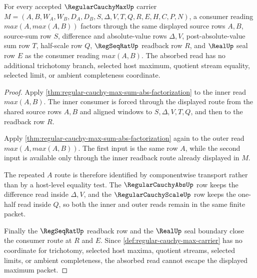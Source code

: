 \begin{theorem}
\label{thm:regular-cauchy-max-lattice-absorption}
For every accepted $\RegularCauchyMaxUp$ carrier $M=(A,B,W_A,W_B,D_A,D_B,S,\Delta,V,T,Q,R,E,H,C,P,N)$, a consumer reading $max(A,max(A,B))$ factors through the same displayed source rows $A,B$, source-sum row $S$, difference and absolute-value rows $\Delta,V$, post-absolute-value sum row $T$, half-scale row $Q$, $\RegSeqRatUp$ readback row $R$, and $\RealUp$ seal row $E$ as the consumer reading $max(A,B)$. The absorbed read has no additional trichotomy branch, selected host maximum, quotient stream equality, selected limit, or ambient completeness coordinate.
\end{theorem}
\begin{proof}
Apply \autoref{thm:regular-cauchy-max-sum-abs-factorization} to the inner read $max(A,B)$. The inner consumer is forced through the displayed route from the shared source rows $A,B$ and aligned windows to $S,\Delta,V,T,Q$, and then to the readback row $R$.

Apply \autoref{thm:regular-cauchy-max-sum-abs-factorization} again to the outer read $max(A,max(A,B))$. The first input is the same row $A$, while the second input is available only through the inner readback route already displayed in $M$.

The repeated $A$ route is therefore identified by componentwise transport rather than by a host-level equality test. The $\RegularCauchyAbsUp$ row keeps the difference read inside $\Delta,V$, and the $\RegularCauchyScaleUp$ row keeps the one-half read inside $Q$, so both the inner and outer reads remain in the same finite packet.

Finally the $\RegSeqRatUp$ readback row and the $\RealUp$ seal boundary close the consumer route at $R$ and $E$. Since \autoref{def:regular-cauchy-max-carrier} has no coordinate for trichotomy, selected host maxima, quotient streams, selected limits, or ambient completeness, the absorbed read cannot escape the displayed maximum packet.
\end{proof}

